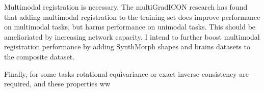 \documentclass{article}
\begin{document}
Multimodal registration is necessary. The multiGradICON research has found that adding multimodal registration to the training set does improve performance on multimodal tasks, but harms performance on unimodal tasks. This should be amelioriated by increasing network capacity. I intend to further boost multimodal registration performance by adding SynthMorph shapes and brains datasets to the composite dataset.

Finally, for some tasks rotational equivariance or exact inverse consistency are required, and these properties
ww








\end{document}
